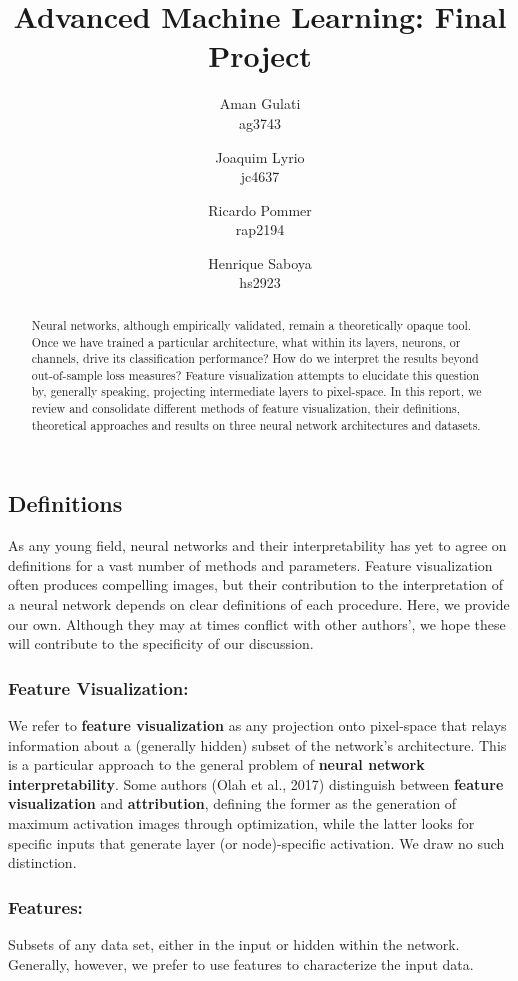 \documentclass[12pt]{article}
\title{Advanced Machine Learning: Final Project}
\author{
	Aman Gulati \\
	ag3743 \\
	\and 
	Joaquim Lyrio  \\
	jc4637 \\
	\and 
	Ricardo Pommer \\
	rap2194 \\
	\and
	Henrique Saboya \\
	hs2923 \\
}
\begin{document}
\maketitle

\begin{abstract}
	Neural networks, although empirically validated, remain a theoretically opaque tool. Once we have trained a particular architecture, what within its layers, neurons, or channels, drive its classification performance? How do we interpret the results beyond out-of-sample loss measures? Feature visualization attempts to elucidate this question by, generally speaking, projecting intermediate layers to pixel-space. In this report,  we review and consolidate different methods of feature visualization, their definitions, theoretical approaches and results on three neural network architectures and datasets.
\end{abstract}

\subsection{Definitions}
As any young field, neural networks and their interpretability has yet to agree on definitions for a vast number of methods and parameters. Feature visualization often produces compelling images, but their contribution to the interpretation of a neural network depends on clear definitions of each procedure. Here, we provide our own. Although they may at times conflict with other authors', we hope these will contribute to the specificity of our discussion.

\subsubsection{Feature Visualization:}
We refer to \textbf{feature visualization} as any projection onto pixel-space that relays information about a (generally hidden) subset of the network's architecture. This is a particular approach to the general problem of \textbf{neural network interpretability}. Some authors (Olah et al., 2017) \cite{distill} distinguish between \textbf{feature visualization} and \textbf{attribution}, defining the former as the generation of maximum activation images through optimization, while the latter looks for specific inputs that generate layer (or node)-specific activation. We draw no such distinction.

\subsubsection{Features:}
Subsets of any data set, either in the input or hidden within the network. Generally, however, we prefer to use features to characterize the input data.
\end{document}
